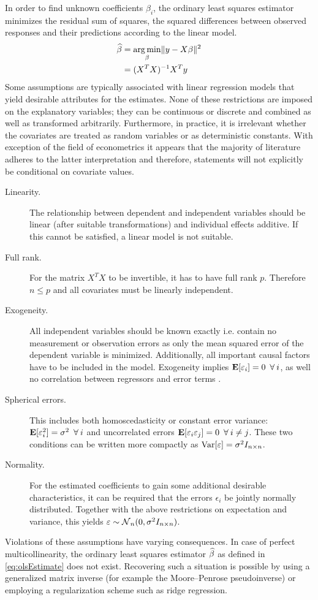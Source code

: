 In order to find unknown coefficients $\beta_i$, the ordinary least squares estimator minimizes the residual sum of squares, the squared differences between observed responses and their predictions according to the linear model.
\begin{subequations}
\begin{align}
  \widehat{\beta} &= \operatorname*{arg\, min}_{\beta} \lVert y - X \beta\rVert^2 \\
         &= (X^T X)^{-1} X^T y \label{eq:olsEstimate}
\end{align}
\end{subequations}
Some assumptions are typically associated with linear regression models that yield desirable attributes for the estimates. None of these restrictions are imposed on the explanatory variables; they can be continuous or discrete and combined as well as transformed arbitrarily. Furthermore, in practice, it is irrelevant whether the covariates are treated as random variables or as deterministic constants. With exception of the field of econometrics it appears that the majority of literature adheres to the latter interpretation and therefore, statements will not explicitly be conditional on covariate values.
\begin{description}
  \item[Linearity.] The relationship between dependent and independent variables should be linear (after suitable transformations) and individual effects additive. If this cannot be satisfied, a linear model is not suitable.
  \item[Full rank.] For the matrix $X^T X$ to be invertible, it has to have full rank $p$. Therefore $n \leq p$ and all covariates must be linearly independent.
  \item[Exogeneity.] All independent variables should be known exactly i.e. contain no measurement or observation errors as only the mean squared error of the dependent variable is minimized. Additionally, all important causal factors have to be included in the model. Exogeneity implies $\Erw[\epsilon_i] = 0 \forall i$, as well no correlation between regressors and error terms \citep{Hayashi2000}.
  \item[Spherical errors.] This includes both homoscedasticity or constant error variance: $\Erw[\epsilon_i^2] = \sigma^2 \forall i$ and uncorrelated errors $\Erw[\epsilon_i \epsilon_j] = 0 \forall i \neq j$. These two conditions can be written more compactly as $\operatorname{Var}[\varepsilon] = \sigma^2I_{n \times n}$.
  \item[Normality.] For the estimated coefficients to gain some additional desirable characteristics, it can be required that the errors $\epsilon_i$ be jointly normally distributed. Together with the above restrictions on expectation and variance, this yields $\varepsilon \sim \operatorname{\mathcal{N}}_n(0, \sigma^2 I_{n \times n})$.
\end{description}
Violations of these assumptions have varying consequences. In case of perfect multicollinearity, the ordinary least squares estimator $\widehat{\beta}$ as defined in \eqref{eq:olsEstimate} does not exist. Recovering such a situation is possible by using a generalized matrix inverse (for example the Moore--Penrose pseudoinverse) or employing a regularization scheme such as ridge regression.

